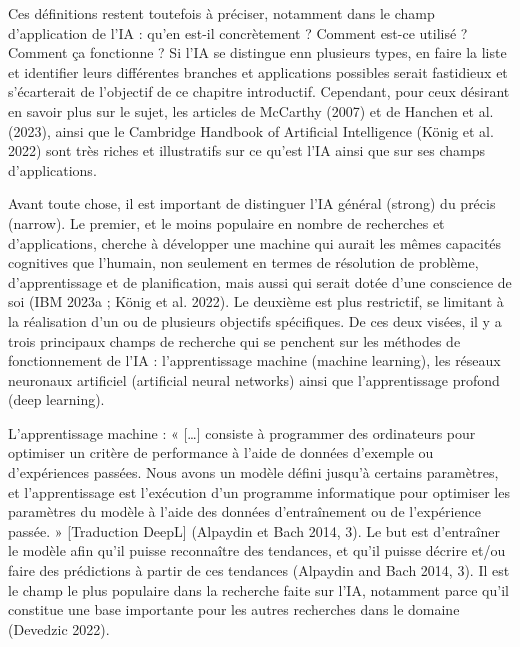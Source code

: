 \documentclass[
  letterpaper,
]{scrbook}
\begin{document}
Ces définitions restent toutefois à préciser, notamment dans le champ
d'application de l'IA : qu'en est-il concrètement ? Comment est-ce
utilisé ? Comment ça fonctionne ? Si l'IA se distingue enn plusieurs
types, en faire la liste et identifier leurs différentes branches et
applications possibles serait fastidieux et s'écarterait de l'objectif
de ce chapitre introductif. Cependant, pour ceux désirant en savoir plus
sur le sujet, les articles de McCarthy (2007) et de Hanchen et al.
(2023), ainsi que le Cambridge Handbook of Artificial Intelligence
(König et al. 2022) sont très riches et illustratifs sur ce qu'est l'IA
ainsi que sur ses champs d'applications.

Avant toute chose, il est important de distinguer l'IA général (strong)
du précis (narrow). Le premier, et le moins populaire en nombre de
recherches et d'applications, cherche à développer une machine qui
aurait les mêmes capacités cognitives que l'humain, non seulement en
termes de résolution de problème, d'apprentissage et de planification,
mais aussi qui serait dotée d'une conscience de soi (IBM 2023a ; König
et al. 2022). Le deuxième est plus restrictif, se limitant à la
réalisation d'un ou de plusieurs objectifs spécifiques. De ces deux
visées, il y a trois principaux champs de recherche qui se penchent sur
les méthodes de fonctionnement de l'IA : l'apprentissage machine
(machine learning), les réseaux neuronaux artificiel (artificial neural
networks) ainsi que l'apprentissage profond (deep learning).

L'apprentissage machine : « {[}\ldots{]} consiste à programmer des
ordinateurs pour optimiser un critère de performance à l'aide de données
d'exemple ou d'expériences passées. Nous avons un modèle défini jusqu'à
certains paramètres, et l'apprentissage est l'exécution d'un programme
informatique pour optimiser les paramètres du modèle à l'aide des
données d'entraînement ou de l'expérience passée. » {[}Traduction
DeepL{]} (Alpaydin et Bach 2014, 3). Le but est d'entraîner le modèle
afin qu'il puisse reconnaître des tendances, et qu'il puisse décrire
et/ou faire des prédictions à partir de ces tendances (Alpaydin and Bach
2014, 3). Il est le champ le plus populaire dans la recherche faite sur
l'IA, notamment parce qu'il constitue une base importante pour les
autres recherches dans le domaine (Devedzic 2022).
\end{document}
